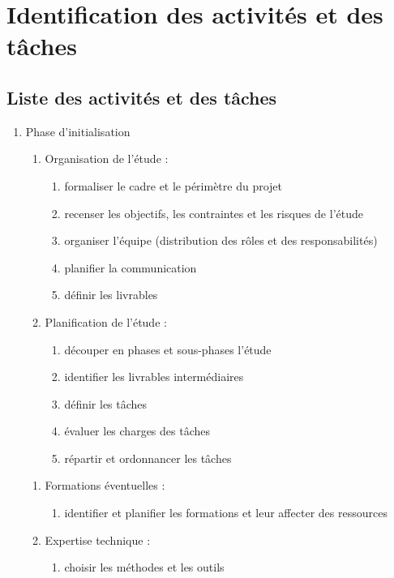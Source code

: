 \chapter{Identification des activités et des tâches}

\section{Liste des activités et des tâches}

\begin{enumerate}
  \item Phase d'initialisation
          \begin{enumerate}
            \item Organisation de l'étude :
              \begin{enumerate}
                  \item formaliser le cadre et le périmètre du projet 
                  \item  recenser les objectifs, les contraintes et les risques de l'étude 
                  \item  organiser l'équipe (distribution des rôles et des responsabilités) 
                  \item  planifier la communication 
                  \item  définir les livrables 
              \end{enumerate}
            \item Planification de l'étude : 
              \begin{enumerate}
                  \item  découper en phases et sous-phases l'étude 
                  \item  identifier les livrables intermédiaires 
                  \item  définir les tâches 
                  \item  évaluer les charges des tâches 
                  \item  répartir et ordonnancer les tâches 
              \end{enumerate}
          \end{enumerate}

          \begin{enumerate}
            \item Formations éventuelles :
                \begin{enumerate}
                  \item identifier et planifier les formations et leur affecter des ressources
                \end{enumerate}
            \item Expertise technique : 
                \begin{enumerate}
                  \item choisir les méthodes et les outils 
                \end{enumerate}
          \end{enumerate}


\end{enumerate}
